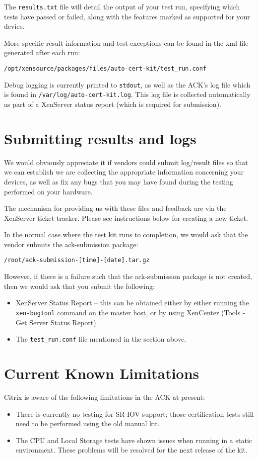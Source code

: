 \documentclass[a4paper,11pt]{article}
\begin{document}
The \verb=results.txt= file will detail the output of your test run, specifying which tests have passed or failed, along with the features marked as supported for your device. 

More specific result information and test exceptions can be found in the xml file generated after each run:
\begin{verbatim}
/opt/xensource/packages/files/auto-cert-kit/test_run.conf
\end{verbatim}

Debug logging is currently printed to \verb=stdout=, as well as the ACK's log file which is found in \verb=/var/log/auto-cert-kit.log=. This log file is collected automatically as part of a XenServer status report (which is required for submission).

\section{Submitting results and logs}
We would obviously appreciate it if vendors could submit log/result files so that we can establish we are collecting the appropriate information concerning your devices, as well as fix any bugs that you may have found during the testing performed on your hardware.

The mechanism for providing us with these files and feedback are via the XenServer ticket tracker. Please see instructions below for creating a new ticket.

In the normal case where the test kit runs to completion, we would ask that the vendor submits the ack-submission package:

\begin{verbatim}
/root/ack-submission-[time]-[date].tar.gz
\end{verbatim}

However, if there is a failure such that the ack-submission package is not created, then we would ask that you submit the following:
\begin{itemize}
\item XenServer Status Report -- this can be obtained either by either running the \verb=xen-bugtool= command on the master host, or by using XenCenter (Tools - Get Server Status Report).
\item The \verb=test_run.conf= file mentioned in the section above.
\end{itemize}

\section{Current Known Limitations}
Citrix is aware of the following limitations in the ACK at present:
\begin{itemize}
\item There is currently no testing for SR-IOV support; those certification tests still need to be performed using the old manual kit.
\item The CPU and Local Storage tests have shown issues when running in a static environment. These problems will be resolved for the next release of the kit.
\end{itemize}
\end{document}
